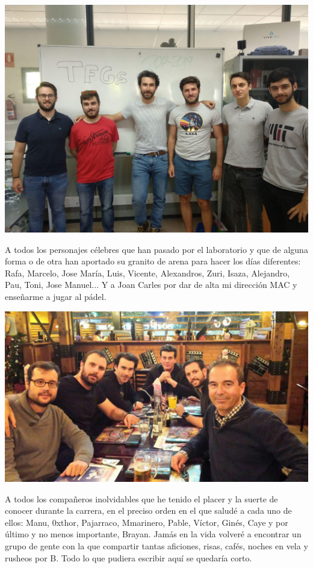 \begin{center}
\includegraphics[width=0.64\linewidth]{Figures/Ack/tfg1}
\end{center}

A todos los personajes célebres que han pasado por el laboratorio y que de alguna forma o de otra han aportado su granito de arena para hacer los días diferentes: Rafa, Marcelo, Jose María, Luis, Vicente, Alexandros, Zuri, Isaza, Alejandro, Pau, Toni, Jose Manuel... Y a Joan Carles por dar de alta mi dirección MAC y enseñarme a jugar al pádel.

\begin{center}
	\includegraphics[width=0.75\linewidth]{Figures/Ack/dtic1}
\end{center}

A todos los compañeros inolvidables que he tenido el placer y la suerte de conocer durante la carrera, en el preciso orden en el que saludé a cada uno de ellos: Manu, 0xthor, Pajarraco, Mmarinero, Pable, Víctor, Ginés, Caye y por último y no menos importante, Brayan. Jamás en la vida volveré a encontrar un grupo de gente con la que compartir tantas aficiones, risas, cafés, noches en vela y rusheos por B. Todo lo que pudiera escribir aquí se quedaría corto.

